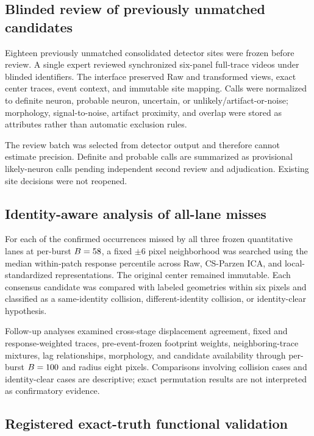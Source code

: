 \subsection{Blinded review of previously unmatched candidates}

Eighteen previously unmatched consolidated detector sites were frozen before
review. A single expert reviewed synchronized six-panel full-trace videos under
blinded identifiers. The interface preserved Raw and transformed views, exact
center traces, event context, and immutable site mapping. Calls were normalized
to definite neuron, probable neuron, uncertain, or unlikely/artifact-or-noise;
morphology, signal-to-noise, artifact proximity, and overlap were stored as
attributes rather than automatic exclusion rules.

The review batch was selected from detector output and therefore cannot estimate
precision. Definite and probable calls are summarized as provisional
likely-neuron calls pending independent second review and adjudication. Existing
site decisions were not reopened.

\subsection{Identity-aware analysis of all-lane misses}

For each of the \VenueStrictMissed{} confirmed occurrences missed by all three
frozen quantitative lanes at per-burst \(B=58\), a fixed
$\pm 6$ pixel neighborhood was searched using the
median within-patch response percentile across Raw, CS-Parzen ICA, and
local-standardized representations. The original center remained immutable.
Each consensus candidate was compared with labeled geometries within six pixels
and classified as a same-identity collision, different-identity collision, or
identity-clear hypothesis.

Follow-up analyses examined cross-stage displacement agreement, fixed and
response-weighted traces, pre-event-frozen footprint weights, neighboring-trace
mixtures, lag relationships, morphology, and candidate availability through
per-burst \(B=100\) and radius eight pixels. Comparisons
involving \VenueIdentityCollision{} collision cases and
\VenueIdentityClear{} identity-clear cases are descriptive; exact permutation
results are not interpreted as confirmatory evidence.

\subsection{Registered exact-truth functional validation}

